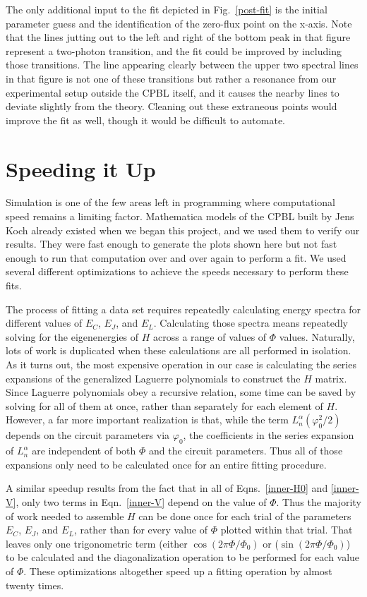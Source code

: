 \documentclass[twocolumn]{revtex4}
\begin{document}
The only additional input to the fit depicted in Fig.~\ref{post-fit}
is the initial parameter guess and the identification of the zero-flux
point on the x-axis. Note that the lines jutting out to the left and
right of the bottom peak in that figure represent a two-photon
transition, and the fit could be improved by including those
transitions. The line appearing clearly between the upper two spectral
lines in that figure is not one of these transitions but rather a
resonance from our experimental setup outside the CPBL itself, and it
causes the nearby lines to deviate slightly from the theory. Cleaning
out these extraneous points would improve the fit as well, though it
would be difficult to automate.

\section{Speeding it Up}

Simulation is one of the few areas left in programming where
computational speed remains a limiting factor. Mathematica models of
the CPBL built by Jens Koch already existed when we began this
project, and we used them to verify our results. They were fast enough
to generate the plots shown here but not fast enough to run that
computation over and over again to perform a fit. We used several
different optimizations to achieve the speeds necessary to perform
these fits.

The process of fitting a data set requires repeatedly calculating
energy spectra for different values of $E_C$, $E_J$, and
$E_L$. Calculating those spectra means repeatedly solving for the
eigenenergies of $H$ across a range of values of $\Phi$
values. Naturally, lots of work is duplicated when these calculations
are all performed in isolation. As it turns out, the most expensive
operation in our case is calculating the series expansions of the
generalized Laguerre polynomials to construct the $H$ matrix. Since
Laguerre polynomials obey a recursive relation, some time can be saved
by solving for all of them at once, rather than separately for each
element of $H$. However, a far more important realization is that,
while the term $L_n^\alpha(\varphi_0^2/2)$ depends on the circuit
parameters via $\varphi_0$, the coefficients in the series expansion
of $L_n^\alpha$ are independent of both $\Phi$ and the circuit
parameters. Thus all of those expansions only need to be calculated
once for an entire fitting procedure.

A similar speedup results from the fact that in all of
Eqns.~\eqref{inner-H0} and \eqref{inner-V}, only two terms in
Eqn.~\eqref{inner-V} depend on the value of $\Phi$. Thus the majority of
work needed to assemble $H$ can be done once for each trial of the
parameters $E_C$, $E_J$, and $E_L$, rather than for every value of
$\Phi$ plotted within that trial. That leaves only one trigonometric
term (either $\cos\left(2\pi\Phi/\Phi_0\right)$ or
($\sin\left(2\pi\Phi/\Phi_0\right)$) to be calculated and the
diagonalization operation to be performed for each value of
$\Phi$. These optimizations altogether speed up a fitting operation by
almost twenty times.
\end{document}
